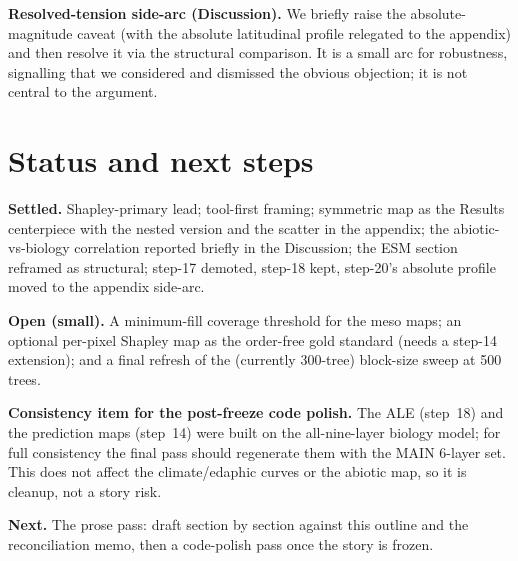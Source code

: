 \documentclass[11pt]{article}
\DeclareRobustCommand{\fpath}[1]{{\small\texttt{\detokenize{#1}}}}
\begin{document}
\textbf{Resolved-tension side-arc (Discussion).} We briefly raise the
absolute-magnitude caveat (with the absolute latitudinal profile relegated to the
appendix) and then resolve it via the structural comparison. It is a small arc
for robustness, signalling that we considered and dismissed the obvious
objection; it is not central to the argument.

\section{Status and next steps}

\textbf{Settled.} Shapley-primary lead; tool-first framing; symmetric map as the
Results centerpiece with the nested version and the scatter in the appendix; the
abiotic-vs-biology correlation reported briefly in the Discussion; the ESM
section reframed as structural; step-17 demoted, step-18 kept, step-20's absolute
profile moved to the appendix side-arc.

\textbf{Open (small).} A minimum-fill coverage threshold for the meso maps; an
optional per-pixel Shapley map as the order-free gold standard (needs a step-14
extension); and a final refresh of the (currently 300-tree) block-size sweep at
500 trees.

\textbf{Consistency item for the post-freeze code polish.} The ALE (step~18) and
the prediction maps (step~14) were built on the all-nine-layer biology model;
for full consistency the final pass should regenerate them with the MAIN 6-layer
set. This does not affect the climate/edaphic curves or the abiotic map, so it is
cleanup, not a story risk.

\textbf{Next.} The prose pass: draft \fpath{manuscript.tex} section by section
against this outline and the reconciliation memo, then a code-polish pass once the
story is frozen.
\end{document}
